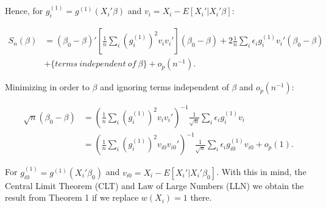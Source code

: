 \documentclass[a4paper]{article}
\begin{document}
Hence, for $g_{i}^{(1)} = g^{(1)}(X_i'\beta)$ and $v_i = X_i - E[X_i'|X_i'\beta]$:

\begin{align*}
S_{n}(\beta) & = (\beta_0 - \beta)'[\frac{1}{n}\sum_i(g_{i}^{(1)})^2v_iv_i'](\beta_0 - \beta)+ 2\frac{1}{n}\sum_i\epsilon_ig_{i}^{(1)}v_i'(\beta_0 - \beta) \\
			 & + \{terms\:independent\:of \:\beta\} + o_p(n^{-1}). 
\end{align*}

Minimizing in order to $\beta$ and ignoring terms independent of $\beta$ and $o_p(n^{-1})$:

\begin{align*}
\sqrt{n}(\beta_0 - \beta) & = (\frac{1}{n}\sum_i(g_{i}^{(1)})^2v_iv_i')^{-1}\frac{1}{\sqrt{n}}\sum_i\epsilon_i g_{i}^{(1)}v_i \\
     					  & = (\frac{1}{n}\sum_i(g_{i}^{(1)})^2v_{i0}v_{i0}')^{-1}\frac{1}{\sqrt{n}}\sum_i\epsilon_i g_{i0}^{(1)}v_{i0} + o_p(1).
\end{align*}

For $g_{i0}^{(1)} = g^{(1)}(X_i'\beta_0)$ and $v_{i0} = X_i - E[X_i'|X_i'\beta_0]$. With this in mind, the Central Limit Theorem (CLT) and Law of Large Numbers (LLN) we obtain the result from Theorem 1 if we replace $w(X_i) = 1$ there.












\end{document}
